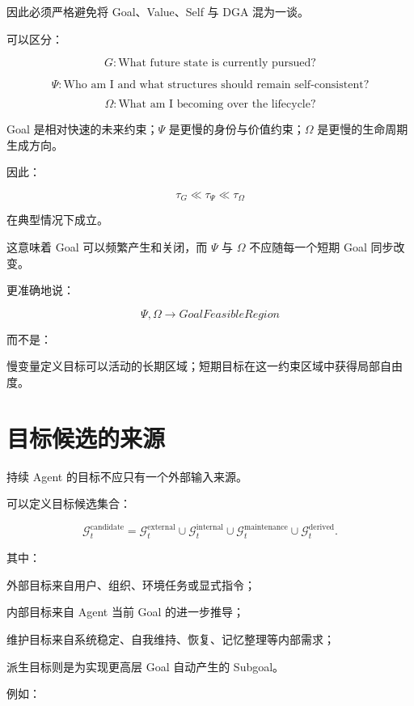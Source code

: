 因此必须严格避免将 Goal、Value、Self 与 DGA 混为一谈。

可以区分：

\[
\boxed{
G:\text{What future state is currently pursued?}
}
\]

\[
\boxed{
\Psi:\text{Who am I and what structures should remain self-consistent?}
}
\]

\[
\boxed{
\Omega:\text{What am I becoming over the lifecycle?}
}
\]

Goal 是相对快速的未来约束；$\Psi$ 是更慢的身份与价值约束；$\Omega$ 是更慢的生命周期生成方向。

因此：

\[
\tau_G
\ll
\tau_\Psi
\ll
\tau_\Omega
\]

在典型情况下成立。

这意味着 Goal 可以频繁产生和关闭，而 $\Psi$ 与 $\Omega$ 不应随每一个短期 Goal 同步改变。

更准确地说：

\[
\boxed{
\Psi,\Omega
\rightarrow
GoalFeasibleRegion
}
\]

而不是：

\begin{statementbox}
\centering
{}
\end{statementbox}

慢变量定义目标可以活动的长期区域；短期目标在这一约束区域中获得局部自由度。


\section{目标候选的来源}

持续 Agent 的目标不应只有一个外部输入来源。

可以定义目标候选集合：

\[
\mathcal G^{\mathrm{candidate}}_t
=
\mathcal G^{\mathrm{external}}_t
\cup
\mathcal G^{\mathrm{internal}}_t
\cup
\mathcal G^{\mathrm{maintenance}}_t
\cup
\mathcal G^{\mathrm{derived}}_t.
\]

其中：

外部目标来自用户、组织、环境任务或显式指令；

内部目标来自 Agent 当前 Goal 的进一步推导；

维护目标来自系统稳定、自我维持、恢复、记忆整理等内部需求；

派生目标则是为实现更高层 Goal 自动产生的 Subgoal。

例如：

